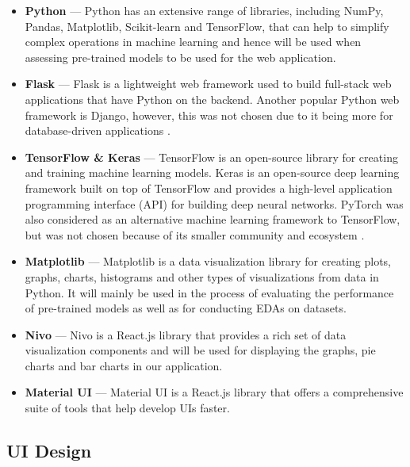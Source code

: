 \documentclass[12pt, a4paper]{article}
\begin{document}
\begin{itemize}

    \item \textbf{Python} --- Python has an extensive range of libraries, including NumPy, Pandas, Matplotlib, Scikit-learn and TensorFlow, that can help to simplify complex operations in machine learning and hence will be used when assessing pre-trained models to be used for the web application.

    \item \textbf{Flask} --- Flask is a lightweight web framework used to build full-stack web applications that have Python on the backend. Another popular Python web framework is Django, however, this was not chosen due to it being more for database-driven applications \citep{flaskdjango}.

    \item \textbf{TensorFlow \& Keras} --- TensorFlow is an open-source library for creating and training machine learning models. Keras is an open-source deep learning framework built on top of TensorFlow and provides a high-level application programming interface (API) for building deep neural networks. PyTorch was also considered as an alternative machine learning framework to TensorFlow, but was not chosen because of its smaller community and ecosystem \citep{tfvspytorch}.

    \item \textbf{Matplotlib} --- Matplotlib is a data visualization library for creating plots, graphs, charts, histograms and other types of visualizations from data in Python. It will mainly be used in the process of evaluating the performance of pre-trained models as well as for conducting EDAs on datasets.
    
    \item \textbf{Nivo} --- Nivo is a React.js library that provides a rich set of data visualization components and will be used for displaying the graphs, pie charts and bar charts in our application.
    
    \item \textbf{Material UI} --- Material UI is a React.js library that offers a comprehensive suite of tools that help develop UIs faster.

\end{itemize}

\subsection{UI Design}
\label{uidesign}
\end{document}
